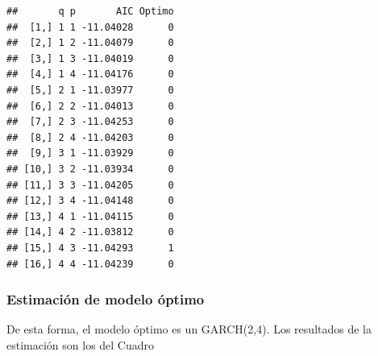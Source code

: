 \documentclass[
]{book}
\begin{document}
\begin{verbatim}
##       q p       AIC Optimo
##  [1,] 1 1 -11.04028      0
##  [2,] 1 2 -11.04079      0
##  [3,] 1 3 -11.04019      0
##  [4,] 1 4 -11.04176      0
##  [5,] 2 1 -11.03977      0
##  [6,] 2 2 -11.04013      0
##  [7,] 2 3 -11.04253      0
##  [8,] 2 4 -11.04203      0
##  [9,] 3 1 -11.03929      0
## [10,] 3 2 -11.03934      0
## [11,] 3 3 -11.04205      0
## [12,] 3 4 -11.04148      0
## [13,] 4 1 -11.04115      0
## [14,] 4 2 -11.03812      0
## [15,] 4 3 -11.04293      1
## [16,] 4 4 -11.04239      0
\end{verbatim}

\hypertarget{estimaciuxf3n-de-modelo-uxf3ptimo}{%
\subsubsection{Estimación de modelo óptimo}\label{estimaciuxf3n-de-modelo-uxf3ptimo}}

De esta forma, el modelo óptimo es un GARCH(2,4). Los resultados de la estimación son los del Cuadro
\end{document}
